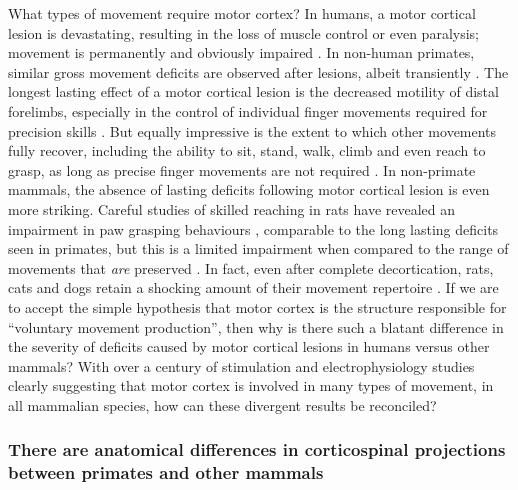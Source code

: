 What types of movement require motor cortex? In humans, a motor cortical lesion is devastating, resulting in the loss of muscle control or even paralysis; movement is permanently and obviously impaired \cite{Laplane1977}. In non-human primates, similar gross movement deficits are observed after lesions, albeit transiently \cite{Leyton1917}. The longest lasting effect of a motor cortical lesion is the decreased motility of distal forelimbs, especially in the control of individual finger movements required for precision skills \cite{Leyton1917,Darling2011}. But equally impressive is the extent to which other movements fully recover, including the ability to sit, stand, walk, climb and even reach to grasp, as long as precise finger movements are not required \cite{Leyton1917,Darling2011,Zaaimi2012}. In non-primate mammals, the absence of lasting deficits following motor cortical lesion is even more striking. Careful studies of skilled reaching in rats have revealed an impairment in paw grasping behaviours \cite{Whishaw1991,Alaverdashvili2008a}, comparable to the long lasting deficits seen in primates, but this is a limited impairment when compared to the range of movements that \emph{are} preserved \cite{Whishaw1991,Kawai2015}. In fact, even after complete decortication, rats, cats and dogs retain a shocking amount of their movement repertoire \cite{Goltz1888,Bjursten1976,Terry1989}. If we are to accept the simple hypothesis that motor cortex is the structure responsible for ``voluntary movement production'', then why is there such a blatant difference in the severity of deficits caused by motor cortical lesions in humans versus other mammals? With over a century of stimulation and electrophysiology studies clearly suggesting that motor cortex is involved in many types of movement, in all mammalian species, how can these divergent results be reconciled?

\subsubsection*{There are anatomical differences in corticospinal projections between primates and other mammals}

